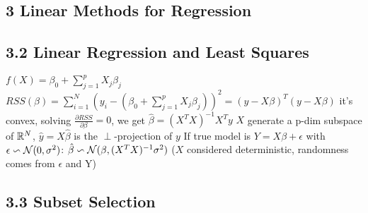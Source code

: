 \documentclass[9pt]{extarticle}
\begin{document}
\begin{multicols*}{2}
\section*{3 Linear Methods for Regression}

\subsection*{3.2 Linear Regression and Least Squares}

$f(X)=\beta_0+\sum_{j=1}^{p}X_j \beta_j$\nl
$RSS(\beta)=\sum_{i=1}^{N}(y_i-(\beta_0+\sum_{j=1}^{p}X_j \beta_j))^2=(y-X\beta)^T(y-X\beta)$\nl
it's convex, solving $\frac{\partial RSS}{\partial \beta}=0$, we get $\hat{\beta}=(X^TX)^{-1}X^Ty$\nl
$X$ generate a p-dim subspace of $\mathbb{R}^N$, $\hat{y}=X\hat{\beta}$ is the $\perp$-projection of $y$\nl
If true model is $Y=X\beta + \epsilon$ with $\epsilon \backsim \mathcal{N}(0,\sigma^2)$:
$\hat{\beta} \backsim \mathcal{N}(\beta,(X^TX)^{-1}\sigma^2)$ ($X$ considered deterministic, randomness comes from $\epsilon$ and Y)


\subsection*{3.3 Subset Selection}

\end{multicols*}
\end{document}
